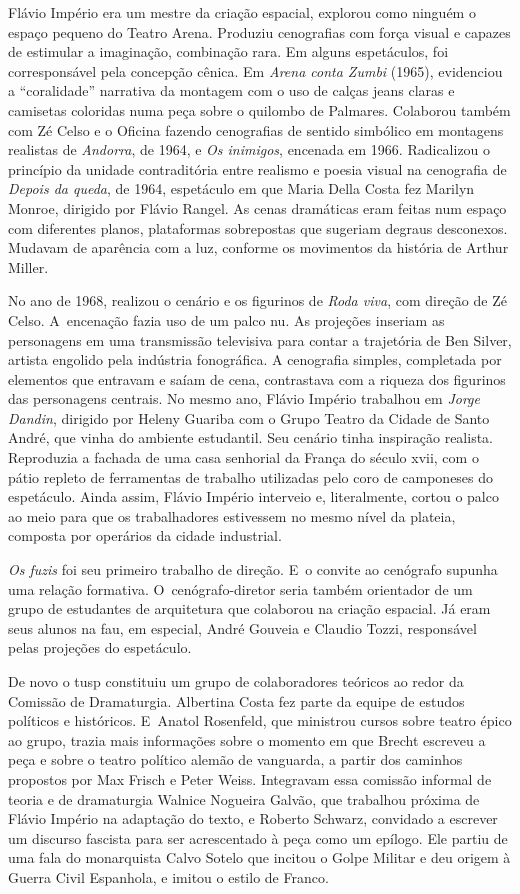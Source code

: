 Flávio Império era um mestre da criação espacial, explorou como ninguém
o espaço pequeno do Teatro Arena. Produziu cenografias com força visual
e capazes de estimular a imaginação, combinação rara. Em alguns
espetáculos, foi corresponsável pela concepção cênica. Em {\it Arena
conta Zumbi} (1965), evidenciou a “coralidade” narrativa da montagem com
o uso de calças jeans claras e camisetas coloridas numa peça sobre
o quilombo de Palmares. Colaborou também com Zé Celso e o Oficina
fazendo cenografias de sentido simbólico em montagens realistas de
{\it Andorra}, de 1964, e {\it Os inimigos}, encenada em 1966.
Radicalizou o princípio da unidade contraditória entre realismo e poesia
visual na cenografia de {\it Depois da queda}, de 1964, espetáculo em
que Maria Della Costa fez Marilyn Monroe, dirigido por Flávio Rangel. As
cenas dramáticas eram feitas num espaço com diferentes planos,
plataformas sobrepostas que sugeriam degraus desconexos. Mudavam de
aparência com a luz, conforme os movimentos da história de Arthur
Miller.

No ano de 1968, realizou o cenário e os figurinos de {\it Roda viva}, com
direção de Zé Celso. A~encenação fazia uso de um palco nu. As projeções
inseriam as personagens em uma transmissão televisiva para contar a
trajetória de Ben Silver, artista engolido pela indústria fonográfica. A
cenografia simples, completada por elementos que entravam e saíam de
cena, contrastava com a riqueza dos figurinos das personagens centrais.
No mesmo ano, Flávio Império trabalhou em {\it Jorge Dandin}, dirigido
por Heleny Guariba com o Grupo Teatro da Cidade de Santo André,
que vinha do ambiente estudantil. Seu cenário tinha inspiração realista.
Reproduzia a fachada de uma casa senhorial da França do século {\sc xvii}, com
o pátio repleto de ferramentas de trabalho utilizadas pelo coro de
camponeses do espetáculo. Ainda assim, Flávio Império interveio e, literalmente,
cortou o palco ao meio para que os trabalhadores
estivessem no mesmo nível da plateia, composta por operários da cidade
industrial.

{\it Os fuzis} foi seu primeiro trabalho de direção. E~o convite ao
cenógrafo supunha uma relação formativa. O~cenógrafo-diretor seria
também orientador de um grupo de estudantes de arquitetura que colaborou
na criação espacial. Já eram seus alunos na {\sc fau}, em especial, André
Gouveia e Claudio Tozzi, responsável pelas projeções do espetáculo.

De novo o {\sc tusp} constituiu um grupo de colaboradores teóricos ao redor da
Comissão de Dramaturgia. Albertina Costa fez parte da equipe de estudos
políticos e históricos. E~Anatol Rosenfeld, que ministrou cursos sobre teatro
épico ao grupo, trazia mais informações sobre o momento em que Brecht
escreveu a peça e sobre o teatro político alemão de vanguarda, a partir
dos caminhos propostos por Max Frisch e Peter Weiss. Integravam essa
comissão informal de teoria e de dramaturgia Walnice Nogueira Galvão,
que trabalhou próxima de Flávio Império na adaptação do texto, e Roberto
Schwarz, convidado a escrever um discurso fascista para ser acrescentado
à peça como um epílogo. Ele partiu de uma fala do monarquista Calvo Sotelo
que incitou o Golpe Militar e deu origem à Guerra Civil Espanhola, e
imitou o estilo de Franco.

